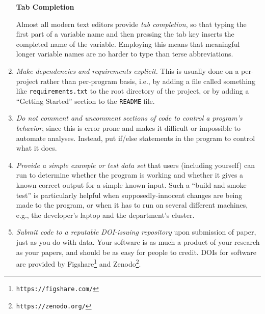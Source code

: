 \documentclass[10pt]{article}
\newcommand{\recommend}[1]{\textit{#1}}
\newcommand{\withurl}[2]{{#1}\footnote{\texttt{#2}}}
\begin{document}
\begin{enumerate}
  \begin{framed}
    \noindent \textbf{Tab Completion}

    Almost all modern text editors provide \emph{tab completion}, so
    that typing the first part of a variable name and then pressing
    the tab key inserts the completed name of the variable.  Employing
    this means that meaningful longer variable names are no harder to type
    than terse abbreviations.

  \end{framed}

\item
  \recommend{Make dependencies and requirements explicit.} This is
  usually done on a per-project rather than per-program basis, i.e.,
  by adding a file called something like \texttt{requirements.txt} to
  the root directory of the project, or by adding a ``Getting
  Started'' section to the \texttt{README} file. 

\item
  \recommend{Do not comment and uncomment sections of code to control
    a program's behavior}, since this is error prone and makes it
  difficult or impossible to automate analyses. Instead, put if/else
  statements in the program to control what it does.

\item
  \recommend{Provide a simple example or test data set} that users
  (including yourself) can run to determine whether the program is
  working and whether it gives a known correct output for a
  simple known input. Such a ``build and smoke test'' is particularly
  helpful when supposedly-innocent changes are being made to the
  program, or when it has to run on several different machines, e.g.,
  the developer's laptop and the department's cluster.

\item
  \recommend{Submit code to a reputable DOI-issuing repository} upon
  submission of paper, just as you do with data. Your software is as
  much a product of your research as your papers, and should be as
  easy for people to credit. DOIs for software are provided by
  \withurl{Figshare}{https://figshare.com/} and
  \withurl{Zenodo}{https://zenodo.org/}.

\end{enumerate}
\end{document}
